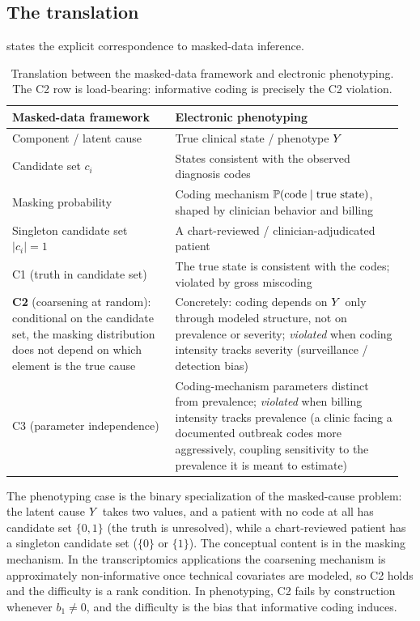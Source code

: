\subsection{The translation}

 states the explicit correspondence to
masked-data inference.

\begin{table}[ht]
\centering
\small
\begin{tabular}{@{}p{0.40\linewidth} p{0.56\linewidth}@{}}
\toprule
\textbf{Masked-data framework} & \textbf{Electronic phenotyping} \\
\midrule
Component / latent cause
  & True clinical state / phenotype $Y$ \\
Candidate set $c_i$
  & States consistent with the observed diagnosis codes \\
Masking probability
  & Coding mechanism $\mathbb{P}(\text{code} \mid \text{true state})$,
    shaped by clinician behavior and billing \\
Singleton candidate set $|c_i| = 1$
  & A chart-reviewed / clinician-adjudicated patient \\
C1 (truth in candidate set)
  & The true state is consistent with the codes;
    violated by gross miscoding \\
\textbf{C2} (coarsening at random): conditional on the candidate set, the masking distribution does not depend on which element is the true cause
  & Concretely: coding depends on $Y$ only through modeled structure,
    not on prevalence or severity; \emph{violated} when coding
    intensity tracks severity (surveillance / detection bias) \\
C3 (parameter independence)
  & Coding-mechanism parameters distinct from prevalence;
    \emph{violated} when billing intensity tracks prevalence (a clinic
    facing a documented outbreak codes more aggressively, coupling
    sensitivity to the prevalence it is meant to estimate) \\
\bottomrule
\end{tabular}
\caption{Translation between the masked-data framework
\citep{towell2026masked} and electronic phenotyping. The C2 row is
load-bearing: informative coding is precisely the C2 violation.}
\label{tab:translation}
\end{table}

The phenotyping case is the binary specialization of the masked-cause
problem: the latent cause $Y$ takes two values, and a patient with no
code at all has candidate set $\{0,1\}$ (the truth is unresolved),
while a chart-reviewed patient has a singleton candidate set
($\{0\}$ or $\{1\}$). The conceptual content is in the masking
mechanism. In the transcriptomics applications
\citep{towell2026scrnacoarsening,towell2026spatialcoarsening} the
coarsening mechanism is approximately non-informative once technical
covariates are modeled, so C2 holds and the difficulty is a rank
condition. In phenotyping, C2 fails by construction whenever $b_1 \neq
0$, and the difficulty is the bias that informative coding induces.

